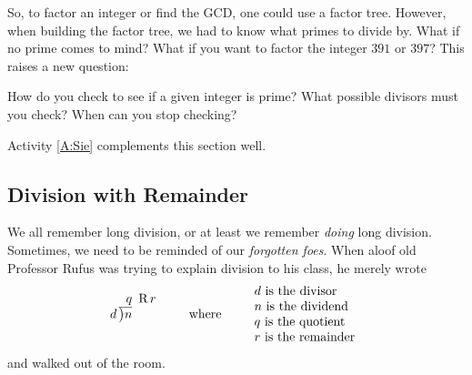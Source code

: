 So, to factor an integer or find the GCD, one could use a factor
tree. However, when building the factor tree, we had to know what
primes to divide by. What if no prime comes to mind? What if you want
to factor the integer $391$ or $397$? This raises a new question:

\begin{question} 
How do you check to see if a given integer is prime? What possible
divisors must you check? When can you stop checking?
\end{question}
\QM


\begin{activitynote}
Activity \ref{A:Sie} complements this section well. %
\end{activitynote}









\subsection{Division with Remainder}


We all remember long division, or at least we
remember \textit{doing} long division. Sometimes, we need to be
reminded of our \textit{forgotten foes}. When
aloof old Professor Rufus was trying to explain division to his class,
he merely wrote
\[
d\,\begin{tabular}[b]{@{}r@{} r}
$q$ &\, R\,$r$\\ \cline{1-1}
\big)\begin{tabular}[t]{@{}l@{}}
$n$ 
\end{tabular}
\end{tabular}
\qquad\text{where}\qquad
\begin{tabular}{l}
$d$ is the divisor \\ \index{divisor}
$n$ is the dividend \\ \index{dividend}
$q$ is the quotient \\ \index{quotient}
$r$ is the remainder \index{remainder}
\end{tabular}
\]
and walked out of the room.

